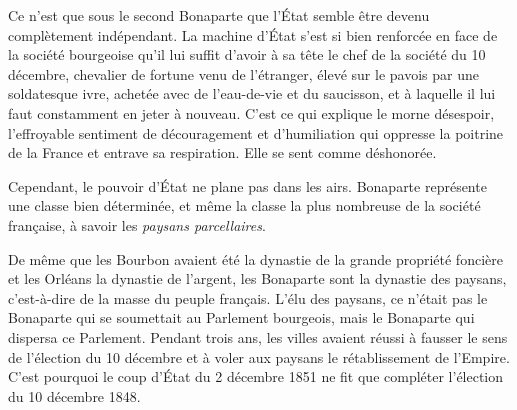 \documentclass[french,twoside]{book} %
\begin{document}
Ce n’est que sous le second Bonaparte que l’État semble être devenu complètement indépendant. La machine d’État s’est si bien renforcée en face de la société bourgeoise qu’il lui suffit d’avoir à sa tête le chef de la société du 10 décembre, chevalier de fortune venu de l’étranger, élevé sur le pavois par une soldatesque ivre, achetée avec de l’eau-de-vie et du saucisson, et à laquelle il lui faut constamment en jeter à nouveau. C’est ce qui explique le morne désespoir, l’effroyable sentiment de découragement et d’humiliation qui oppresse la poitrine de la France et entrave sa respiration. Elle se sent comme déshonorée.\par
Cependant, le pouvoir d’État ne plane pas dans les airs. Bonaparte représente une classe bien déterminée, et même la classe la plus nombreuse de la société française, à savoir les \emph{paysans parcellaires}.\par
De même que les Bourbon avaient été la dynastie de la grande propriété foncière et les Orléans la dynastie de l’argent, les Bonaparte sont la dynastie des paysans, c’est-à-dire de la masse du peuple français. L’élu des paysans, ce n’était pas le Bonaparte qui se soumettait au Parlement bourgeois, mais le Bonaparte qui dispersa ce Parlement. Pendant trois ans, les villes avaient réussi à fausser le sens de l’élection du 10 décembre et à voler aux paysans le rétablissement de l’Empire. C’est pourquoi le coup d’État du 2 décembre 1851 ne fit que compléter l’élection du 10 décembre 1848.\par
\end{document}
